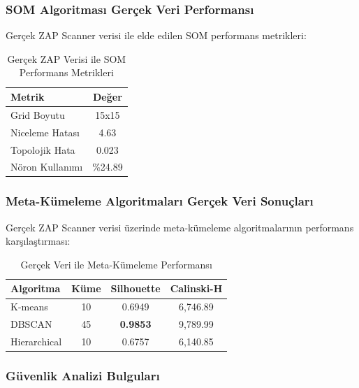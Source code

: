 \subsubsection{SOM Algoritması Gerçek Veri Performansı}

Gerçek ZAP Scanner verisi ile elde edilen SOM performans metrikleri:

\begin{table}[!ht]
\centering
\caption{Gerçek ZAP Verisi ile SOM Performans Metrikleri}
\label{tab:real_som_performance}
\tiny
\begin{tabular}{|l|c|}
\hline
\textbf{Metrik} & \textbf{Değer} \\
\hline
Grid Boyutu & 15x15 \\
\hline
Niceleme Hatası & 4.63 \\
\hline
Topolojik Hata & 0.023 \\
\hline
Nöron Kullanımı & \%24.89 \\
\hline
\end{tabular}
\end{table}

\newpage

\subsubsection{Meta-Kümeleme Algoritmaları Gerçek Veri Sonuçları}

Gerçek ZAP Scanner verisi üzerinde meta-kümeleme algoritmalarının performans karşılaştırması:

\begin{table}[!ht]
\centering
\caption{Gerçek Veri ile Meta-Kümeleme Performansı}
\label{tab:real_clustering_performance}
\footnotesize
\begin{tabular}{|l|c|c|c|}
\hline
\textbf{Algoritma} & \textbf{Küme} & \textbf{Silhouette} & \textbf{Calinski-H} \\
\hline
K-means & 10 & 0.6949 & 6,746.89 \\
\hline
DBSCAN & 45 & \textbf{0.9853} & 9,789.99 \\
\hline
Hierarchical & 10 & 0.6757 & 6,140.85 \\
\hline
\end{tabular}
\end{table}

\subsubsection{Güvenlik Analizi Bulguları}

